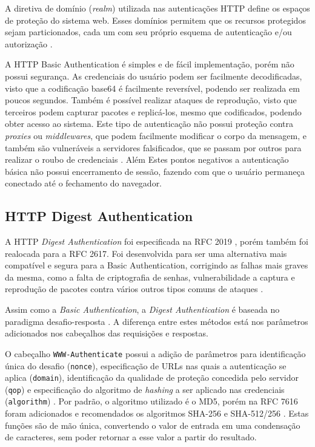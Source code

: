 \documentclass[12pt]{article}
\begin{document}
A diretiva de domínio (\emph{realm}) utilizada nas autenticações HTTP define os espaços de proteção 
do sistema web. Esses domínios permitem que os recursos protegidos sejam particionados, cada um com 
seu próprio esquema de autenticação e/ou autorização \cite{RFC2617}.

A HTTP Basic Authentication é simples e de fácil implementação, porém não possui segurança. As 
credenciais do usuário podem ser facilmente decodificadas, visto que a codificação base64 é 
facilmente reversível, podendo ser realizada em poucos segundos. Também é possível realizar ataques 
de reprodução, visto que terceiros podem capturar pacotes e replicá-los, mesmo que codificados, 
podendo obter acesso ao sistema. Este tipo de autenticação não possui proteção contra \emph{proxies} 
ou \emph{middlewares}, que podem facilmente modificar o corpo da mensagem, e também são vulneráveis 
a servidores falsificados, que se passam por outros para realizar o roubo de credenciais 
\cite{GOURLEY2002}. Além Estes  pontos negativos a autenticação básica não possui encerramento de 
sessão, fazendo com que o usuário  permaneça conectado até o fechamento do navegador.

\subsection{HTTP Digest Authentication}

A HTTP \emph{Digest Authentication} foi especificada na RFC 2019 \cite{RFC2019}, porém também foi 
realocada para a RFC 2617. Foi desenvolvida para ser uma alternativa mais compatível e segura  para 
a Basic Authentication, corrigindo as falhas mais graves da mesma, como a falta de criptografia de 
senhas, vulnerabilidade a captura e reprodução de pacotes contra vários outros tipos comuns de 
ataques \cite{GOURLEY2002}.

Assim como a \emph{Basic Authentication}, a \emph{Digest Authentication} é baseada no paradigma 
desafio-resposta \cite{RFC7616}. A diferença entre estes métodos está nos parâmetros adicionados nos 
cabeçalhos das requisições e respostas. 

O cabeçalho \texttt{WWW-Authenticate} possui a adição de parâmetros para identificação única do 
desafio (\texttt{nonce}), especificação de URLs nas quais a autenticação se aplica 
(\texttt{domain}), identificação da qualidade de proteção concedida pelo servidor (\texttt{qop}) e 
especificação do algoritmo de \emph{hashing} a ser aplicado nas credenciais (\texttt{algorithm}) 
\cite{CHAPMAN2012}. Por padrão, o algoritmo utilizado é o MD5, porém na RFC 7616 foram adicionados 
e recomendados os algoritmos SHA-256 e SHA-512/256 \cite{RFC7616}. Estas funções são de mão única, 
convertendo o valor de entrada em uma condensação de caracteres, sem poder retornar a esse valor a 
partir do resultado.
\end{document}
